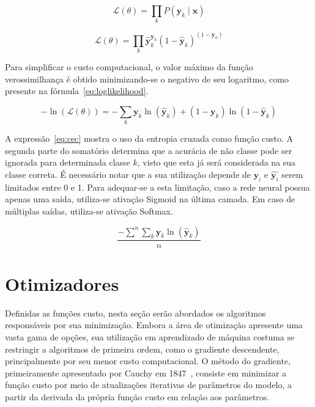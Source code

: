 \begin{equation} \label{eq:likelihood-label}
    \mathcal{L}(\theta) = \prod_k P(\mathbf{y}_k \mid \mathbf{x})
\end{equation}

\begin{equation} \label{eq:likelihood-map}
    \mathcal{L}(\theta) = \prod_k \mathbf{\hat{y}}_k^{\mathbf{y}_k} (1 - \mathbf{\hat{y}}_k)^{(1 - \mathbf{y}_k)}
\end{equation}

Para simplificar o custo computacional, o valor máximo da função verossimilhança é obtido minimizando-se o negativo de seu logaritmo, como presente na fórmula~\ref{eq:loglikelihood}.

\begin{equation} \label{eq:loglikelihood}
        -\ln(\mathcal{L}(\theta)) = -\sum_k \mathbf{y}_k \ln(\mathbf{\hat{y}}_k) + (1 - \mathbf{y}_k) \ln(1 - \mathbf{\hat{y}}_k)
\end{equation}

A expressão~\ref{eq:cec} mostra o uso da entropia cruzada como função custo. A segunda parte do somatório determina que a acurácia de não classe pode ser ignorada para determinada classe $k$, visto que esta já será considerada na sua classe correta. É necessário notar que a sua utilização depende de $\mathbf{y}_i$ e $\hat{\mathbf{y}_i}$ serem limitados entre 0 e 1. Para adequar-se a esta limitação, caso a rede neural possua apenas uma saída, utiliza-se ativação Sigmoid na última camada. Em caso de múltiplas saídas, utiliza-se ativação Softmax.

\begin{equation} \label{eq:cec}
    \frac{-\displaystyle\sum^n \sum_k \mathbf{y}_k \ln(\mathbf{\hat{y}}_k)}{n}
\end{equation}

\section{Otimizadores}

Definidas as funções custo, nesta seção serão abordados os algoritmos responsáveis por sua minimização. Embora a área de otimização apresente uma vasta gama de opções, sua utilização em aprendizado de máquina costuma se restringir a algoritmos de primeira ordem, como o gradiente descendente, principalmente por seu menor custo computacional. O método do gradiente, primeiramente apresentado por Cauchy em 1847~\cite{cauchy1847}, consiste em minimizar a função custo por meio de atualizações iterativas de parâmetros do modelo, a partir da derivada da própria função custo em relação aos parâmetros.

